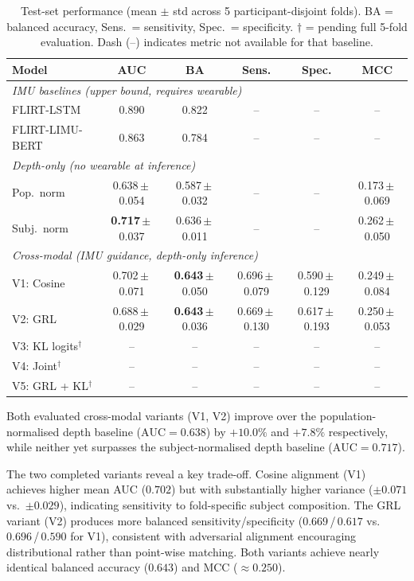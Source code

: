 \documentclass[sigconf,anonymous=false]{acmart}
\begin{document}
\begin{table}[h]
\centering
\caption{Test-set performance (mean $\pm$ std across 5 participant-disjoint folds).
BA = balanced accuracy, Sens.\ = sensitivity, Spec.\ = specificity.
$\dagger$ = pending full 5-fold evaluation.
Dash (--) indicates metric not available for that baseline.}
\label{tab:results}
\small
\begin{tabular}{lccccc}
\toprule
\textbf{Model} & \textbf{AUC} & \textbf{BA} & \textbf{Sens.} & \textbf{Spec.} & \textbf{MCC} \\
\midrule
\multicolumn{6}{l}{\textit{IMU baselines (upper bound, requires wearable)}} \\
FLIRT-LSTM        & 0.890 & 0.822 & -- & -- & -- \\
FLIRT-LIMU-BERT   & 0.863 & 0.784 & -- & -- & -- \\
\midrule
\multicolumn{6}{l}{\textit{Depth-only (no wearable at inference)}} \\
Pop.\ norm  & 0.638\,$\pm$\,0.054 & 0.587\,$\pm$\,0.032
            & -- & -- & 0.173\,$\pm$\,0.069 \\
Subj.\ norm & \textbf{0.717}\,$\pm$\,0.037 & 0.636\,$\pm$\,0.011
            & -- & -- & 0.262\,$\pm$\,0.050 \\
\midrule
\multicolumn{6}{l}{\textit{Cross-modal (IMU guidance, depth-only inference)}} \\
V1: Cosine
  & 0.702\,$\pm$\,0.071 & \textbf{0.643}\,$\pm$\,0.050
  & 0.696\,$\pm$\,0.079 & 0.590\,$\pm$\,0.129 & 0.249\,$\pm$\,0.084 \\
V2: GRL
  & 0.688\,$\pm$\,0.029 & \textbf{0.643}\,$\pm$\,0.036
  & 0.669\,$\pm$\,0.130 & 0.617\,$\pm$\,0.193 & 0.250\,$\pm$\,0.053 \\
V3: KL logits$^\dagger$  & -- & -- & -- & -- & -- \\
V4: Joint$^\dagger$      & -- & -- & -- & -- & -- \\
V5: GRL + KL$^\dagger$   & -- & -- & -- & -- & -- \\
\bottomrule
\end{tabular}
\end{table}

Both evaluated cross-modal variants (V1, V2) improve over the
population-normalised depth baseline ($\text{AUC}=0.638$) by $+10.0\%$
and $+7.8\%$ respectively, while neither yet surpasses the subject-normalised
depth baseline ($\text{AUC}=0.717$).

The two completed variants reveal a key trade-off.  Cosine alignment (V1)
achieves higher mean AUC ($0.702$) but with substantially higher variance
($\pm0.071$ vs.\ $\pm0.029$), indicating sensitivity to fold-specific subject
composition.  The GRL variant (V2) produces more balanced sensitivity/specificity
($0.669$\,/\,$0.617$ vs.\ $0.696$\,/\,$0.590$ for V1), consistent with
adversarial alignment encouraging distributional rather than point-wise matching.  Both variants
achieve nearly identical balanced accuracy ($0.643$) and MCC ($\approx 0.250$).
\end{document}
